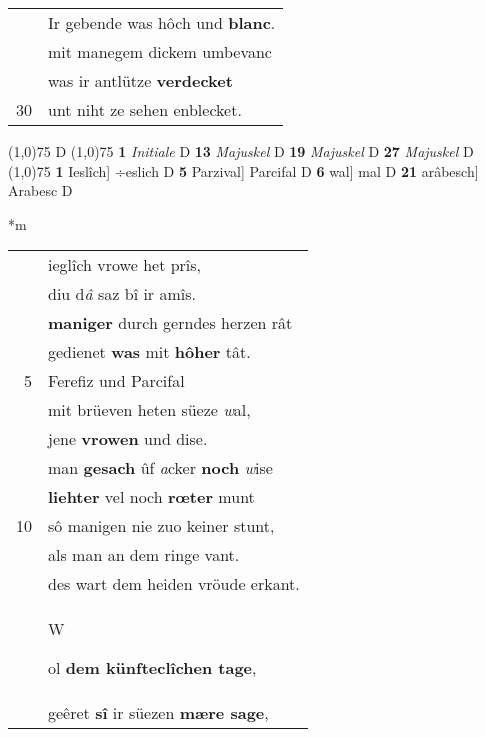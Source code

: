\documentclass[8pt,a4paper,notitlepage]{article}
\begin{document}
\begin{table}[ht]
\begin{minipage}[t]{0.5\linewidth}
\begin{tabular}{rl}
 & Ir gebende was hôch und \textbf{blanc}.\\ 
 & mit manegem dickem umbevanc\\ 
 & was ir antlütze \textbf{verdecket}\\ 
30 & unt niht ze sehen enblecket.\\ 
\end{tabular}
\scriptsize
\line(1,0){75} \newline
D \newline
\line(1,0){75} \newline
\textbf{1} \textit{Initiale} D  \textbf{13} \textit{Majuskel} D  \textbf{19} \textit{Majuskel} D  \textbf{27} \textit{Majuskel} D  \newline
\line(1,0){75} \newline
\textbf{1} Ieslîch] ÷eslich D \textbf{5} Parzival] Parcifal D \textbf{6} wal] mal D \textbf{21} arâbesch] Arabesc D \newline
\end{minipage}
\hspace{0.5cm}
\begin{minipage}[t]{0.5\linewidth}
\small
\begin{center}*m
\end{center}
\begin{tabular}{rl}
 & ieglîch vrowe het prîs,\\ 
 & diu d\textit{â} saz bî ir amîs.\\ 
 & \textbf{maniger} durch gerndes herzen rât\\ 
 & gedienet \textbf{was} mit \textbf{hôher} tât.\\ 
5 & Ferefiz und Parcifal\\ 
 & mit brüeven heten süeze \textit{w}al,\\ 
 & jene \textbf{vrowen} und dise.\\ 
 & man \textbf{gesach} ûf \textit{a}cker \textbf{noch} \textit{w}ise\\ 
 & \textbf{liehter} vel noch \textbf{rœter} munt\\ 
10 & sô manigen nie zuo keiner stunt,\\ 
 & als man an dem ringe vant.\\ 
 & des wart dem heiden vröude erkant.\\ 
 & \begin{large}W\end{large}ol \textbf{dem künfteclîchen tage},\\ 
 & geêret \textbf{sî} ir süezen \textbf{mære sage},\\ 

\end{tabular}
\end{minipage}
\end{table}
\end{document}
